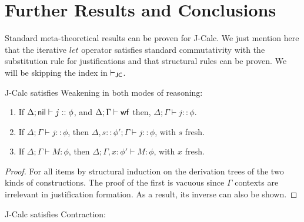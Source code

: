 \documentclass[11pt]{entcs}
\begin{document}
{\section{Further Results and Conclusions}\label{sec:Meta}

Standard meta-theoretical results can be proven for  {\sf J-Calc}. We just mention here that the iterative $let$ operator satisfies standard commutativity with the substitution rule for justifications and that structural rules can be proven. We will be skipping the index in $\vdash_{\sf JC}$.

\begin{theorem}[Weakening]
{\sf J-Calc} satisfies Weakening in both modes of reasoning:

\begin{enumerate}
\item If $\Delta; {\sf nil}\vdash j::\phi$, and $\Delta; {\Gamma}\vdash{\sf wf} $ then, $\Delta; \Gamma \vdash j::\phi$.
\item If $\Delta; \Gamma \vdash j::\phi$, then $\Delta, s::\phi'; \Gamma \vdash j::\phi$, with $s$ fresh.
\item If $\Delta; {\Gamma} \vdash M:\phi$, then $\Delta; \Gamma, x\!:\!\phi' \vdash M:\phi$, with $x$ fresh.
\end{enumerate}
\end{theorem}
\begin{proof}
For all items by structural induction on the derivation trees  of the two kinds of constructions. The proof of the first is vacuous since $\Gamma$ contexts are irrelevant in justification formation. As a result, its inverse can also be shown.
\end{proof}
\begin{theorem}[Contraction]
{\sf J-Calc} satisfies Contraction:


\end{theorem}}
\end{document}
